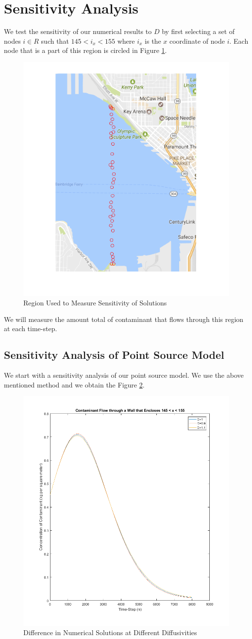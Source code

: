 \documentclass[a4paper]{article}
\theoremstyle{remark}
\theoremstyle{remark}
\begin{document}
\section{Sensitivity Analysis} \label{SensitivityAnalysisSection}
We test the sensitivity of our numerical results to $D$ by first selecting a set of nodes $i \in R$ such that $145 < i_{x} <155$ where $i_{x}$ is the $x$ coordinate of node $i$. Each node that is a part of this region is circled in Figure \ref{sensewall}.

\begin{figure}[H]   
\centering   
   \includegraphics[trim=0mm 0mm 0mm 0mm,clip,width=0.5\linewidth]{sensewall.png}
    \caption{Region Used to Measure Sensitivity of Solutions}
    \label{sensewall}
\end{figure}

\noindent We will measure the amount total of contaminant that flows through this region at each time-step.
\subsection{Sensitivity Analysis of Point Source Model} \label{SensitivityAnalysisPointSourceSection}
We start with a sensitivity analysis of our point source model. We use the above mentioned method and we obtain the  Figure \ref{sensepoint}.
\begin{figure}[H]   
\centering   
   \includegraphics[trim=0mm 0mm 0mm 0mm,clip,width=0.5\linewidth]{sensepoint.png}
    \caption{Difference in Numerical Solutions at Different Diffusivities}
    \label{sensepoint}
\end{figure}
\end{document}
